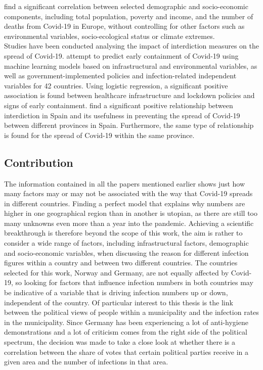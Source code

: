 \cite{sannigrahi2020examining} find a significant correlation between selected demographic and socio-economic components, including total population, poverty and income, and the number of deaths from Covid-19 in Europe, without controlling for other factors such as environmental variables, socio-ecological status or climate extremes. \\
Studies have been conducted analysing the impact of interdiction measures on the spread of Covid-19. \cite{kasilingam2020exploring} attempt to predict early containment of Covid-19 using machine learning models based on infrastructural and environmental variables, as well as government-implemented policies and infection-related independent variables for 42 countries. Using logistic regression, a significant positive association is found between healthcare infrastructure and lockdown policies and signs of early containment. 
\cite{orea2020effective} find a significant positive relationship between interdiction in Spain and its usefulness in preventing the spread of Covid-19 between different provinces in Spain. Furthermore, the same type of relationship is found for the spread of Covid-19 within the same province. \\
\subsection{Contribution}
The information contained in all the papers mentioned earlier shows just how many factors may or may not be associated with the way that Covid-19 spreads in different countries. Finding a perfect model that explains why numbers are higher in one geographical region than in another is utopian, as there are still too many unknowns even more than a year into the pandemic. Achieving a scientific breakthrough is therefore beyond the scope of this work, the aim is rather to consider a wide range of factors, including infrastructural factors, demographic and socio-economic variables, when discussing the reason for different infection figures within a country and between two different countries. The countries selected for this work, Norway and Germany, are not equally affected by Covid-19, so looking for factors that influence infection numbers in both countries may be indicative of a variable that is driving infection numbers up or down, independent of the country. Of particular interest to this thesis is the link between the political views of people within a municipality and the infection rates in the municipality. Since Germany has been experiencing a lot of anti-hygiene demonstrations and a lot of criticism comes from the right side of the political spectrum, the decision was made to take a close look at whether there is a correlation between the share of votes that certain political parties receive in a given area and the number of infections in that area.
\clearpage
